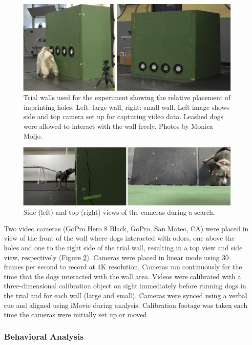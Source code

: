 \documentclass[
]{article}
\begin{document}
\begin{figure}
\includegraphics[width=0.95\linewidth]{figures/trialbox2} \caption{Trial walls used for the experiment showing the relative placement of imprinting holes. Left: large wall, right: small wall. Left image shows side and top camera set up for capturing video data. Leashed dogs were allowed to interact with the wall freely. Photos by Monica Moljo.}\label{fig:trial-box}
\end{figure}

\begin{figure}
\includegraphics[width=0.95\linewidth]{figures/top-side-view} \caption{Side (left) and top (right) views of the cameras during a search.}\label{fig:top-side-view}
\end{figure}

Two video cameras (GoPro Hero 8 Black, GoPro, San Mateo, CA) were placed in view of the front of the wall where dogs interacted with odors, one above the holes and one to the right side of the trial wall, resulting in a top view and side view, respectively (Figure \ref{fig:top-side-view}). Cameras were placed in linear mode using 30 frames per second to record at 4K resolution. Cameras ran continuously for the time that the dogs interacted with the wall area. Videos were calibrated with a three-dimensional calibration object on sight immediately before running dogs in the trial and for each wall (large and small). Cameras were synced using a verbal cue and aligned using iMovie during analysis. Calibration footage was taken each time the cameras were initially set up or moved.

\hypertarget{behavioral-analysis}{%
\subsubsection{Behavioral Analysis}\label{behavioral-analysis}}
\end{document}
